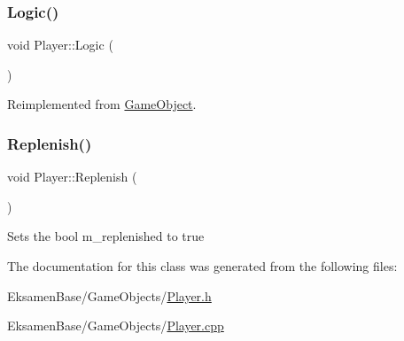 \subsubsection{\texorpdfstring{Logic()}{Logic()}}
{\footnotesize\ttfamily void Player\+::\+Logic (\begin{DoxyParamCaption}{ }\end{DoxyParamCaption})\hspace{0.3cm}{\ttfamily [virtual]}}



Reimplemented from \mbox{\hyperlink{class_game_object_a79510ffc77339fe850491dce9f580fa9}{Game\+Object}}.

\mbox{\label{class_player_a7da8c52d956abfc5a31742545c5d50b8}} 
\subsubsection{\texorpdfstring{Replenish()}{Replenish()}}
{\footnotesize\ttfamily void Player\+::\+Replenish (\begin{DoxyParamCaption}{ }\end{DoxyParamCaption})}



Sets the bool m\+\_\+replenished to true 



The documentation for this class was generated from the following files\+:\begin{DoxyCompactItemize}
\item 
Eksamen\+Base/\+Game\+Objects/\mbox{\hyperlink{_player_8h}{Player.\+h}}\item 
Eksamen\+Base/\+Game\+Objects/\mbox{\hyperlink{_player_8cpp}{Player.\+cpp}}\end{DoxyCompactItemize}
